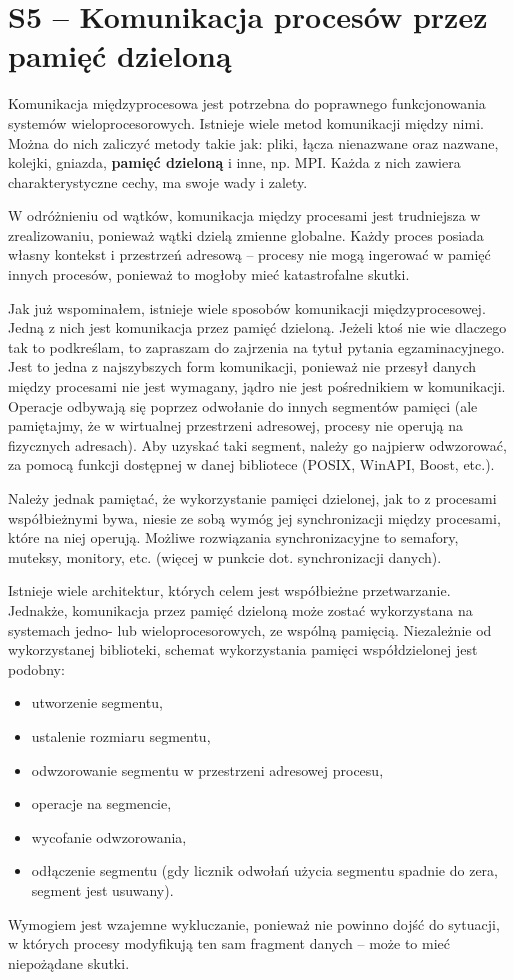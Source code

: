 \section{S5 -- Komunikacja procesów przez pamięć dzieloną}

Komunikacja międzyprocesowa jest potrzebna do poprawnego funkcjonowania systemów wieloprocesorowych. Istnieje wiele metod komunikacji między nimi. Można do nich zaliczyć metody takie jak: pliki, łącza nienazwane oraz nazwane, kolejki, gniazda, \textbf{pamięć dzieloną} i inne, np. MPI. Każda z nich zawiera charakterystyczne cechy, ma swoje wady i zalety. 

W odróżnieniu od wątków, komunikacja między procesami jest trudniejsza w zrealizowaniu, ponieważ wątki dzielą zmienne globalne. Każdy proces posiada własny kontekst i przestrzeń adresową -- procesy nie mogą ingerować w pamięć innych procesów, ponieważ to mogłoby mieć katastrofalne skutki.

Jak już wspominałem, istnieje wiele sposobów komunikacji międzyprocesowej. Jedną z nich jest komunikacja przez pamięć dzieloną. Jeżeli ktoś nie wie dlaczego tak to podkreślam, to zapraszam do zajrzenia na tytuł pytania egzaminacyjnego. Jest to jedna z najszybszych form komunikacji, ponieważ nie przesył danych między procesami nie jest wymagany, jądro nie jest pośrednikiem w komunikacji. Operacje odbywają się poprzez odwołanie do innych segmentów pamięci (ale pamiętajmy, że w wirtualnej przestrzeni adresowej, procesy nie operują na fizycznych adresach). Aby uzyskać taki segment, należy go najpierw odwzorować, za pomocą funkcji dostępnej w danej bibliotece (POSIX, WinAPI, Boost, etc.).

Należy jednak pamiętać, że wykorzystanie pamięci dzielonej, jak to z procesami współbieżnymi bywa, niesie ze sobą wymóg jej synchronizacji między procesami, które na niej operują. Możliwe rozwiązania synchronizacyjne to semafory, muteksy, monitory, etc. (więcej w punkcie dot. synchronizacji danych).

Istnieje wiele architektur, których celem jest współbieżne przetwarzanie. Jednakże, komunikacja przez pamięć dzieloną może zostać wykorzystana na systemach jedno- lub wieloprocesorowych, ze wspólną pamięcią. Niezależnie od wykorzystanej biblioteki, schemat wykorzystania pamięci współdzielonej jest podobny:
\begin{itemize}
\item utworzenie segmentu,
\item ustalenie rozmiaru segmentu,
\item odwzorowanie segmentu w przestrzeni adresowej procesu,
\item operacje na segmencie,
\item wycofanie odwzorowania,
\item odłączenie segmentu (gdy licznik odwołań użycia segmentu spadnie do zera, segment jest usuwany).
\end{itemize}
Wymogiem jest wzajemne wykluczanie, ponieważ nie powinno dojść do sytuacji, w których procesy modyfikują ten sam fragment danych -- może to mieć niepożądane skutki.

